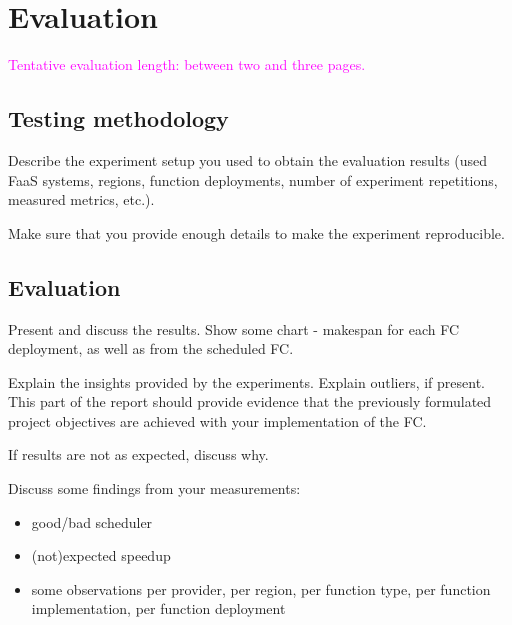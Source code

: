 \chapter{\label{chap:evaluation}Evaluation}

\textcolor{magenta}{Tentative evaluation length: between two and three pages.}



%
%
%
\section{Testing methodology}

Describe the experiment setup you used to obtain the evaluation results (used FaaS systems, regions, function deployments, number of experiment repetitions, measured metrics, etc.).

Make sure that you provide enough details to make the experiment reproducible.



%
%
%
\section{Evaluation}

Present and discuss the results. Show some chart - makespan for each FC deployment, as well as from the scheduled FC. 

Explain the insights provided by the experiments. Explain outliers, if present. 
This part of the report should provide evidence that the previously formulated project objectives are achieved with your implementation of the FC.

If results are not as expected, discuss why.

Discuss some findings from your measurements:
\begin{itemize}
    \item good/bad scheduler
    \item (not)expected speedup
    \item some observations per provider, per region, per function type, per function implementation, per function deployment
\end{itemize}
